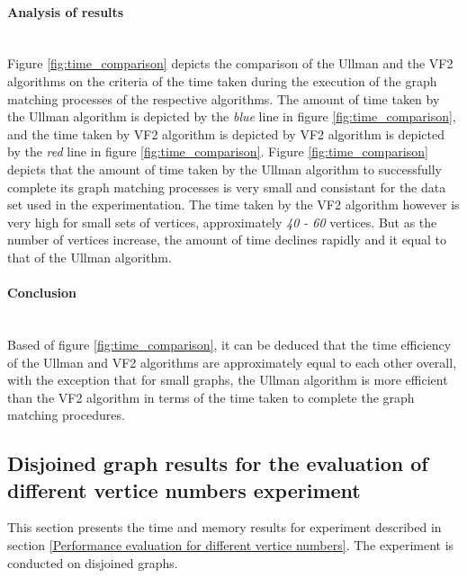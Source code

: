 \paragraph{Analysis of results}\mbox{}\\
Figure \ref{fig:time_comparison} depicts the comparison of the Ullman and the VF2 algorithms on the criteria of the time taken during the execution of the graph matching processes
of the respective algorithms.\newline\newline
The amount of time taken by the Ullman algorithm is depicted by the \textit{blue} line in figure \ref{fig:time_comparison}, and the time taken by VF2 algorithm 
is depicted by VF2 algorithm is depicted by the \textit{red} line in figure \ref{fig:time_comparison}.\newline\newline
Figure \ref{fig:time_comparison} depicts that the amount of time taken by the Ullman algorithm to successfully complete its graph matching processes is very 
small and consistant for the data set used in the experimentation.\newline\newline
The time taken by the VF2 algorithm however is very high for small sets of vertices, approximately \textit{40 - 60} vertices. But as the number of vertices 
increase, the amount of time declines rapidly and it equal to that of the Ullman algorithm.

\paragraph{Conclusion}\mbox{}\\
Based of figure \ref{fig:time_comparison}, it can be deduced that the time efficiency of the Ullman and VF2 algorithms are approximately equal to each other overall,
with the exception that for small graphs, the Ullman algorithm is more efficient than the VF2 algorithm in terms of the time taken to complete the graph matching
procedures.

\subsection{Disjoined graph results for the evaluation of different vertice numbers experiment}
This section presents the time and memory results for experiment described in section \ref{Performance evaluation for different vertice numbers}. The 
experiment is conducted on disjoined graphs.

